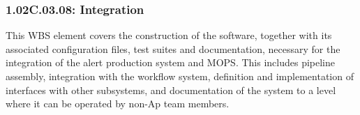 \subsubsection{1.02C.03.08: Integration}

This WBS element covers the construction of the software, together with
its associated configuration files, test suites and documentation, necessary
for the integration of the alert production system and MOPS.  This includes
pipeline assembly, integration with the workflow system, definition and
implementation of interfaces with other subsystems, and documentation
of the system to a level where it can be operated by non-Ap team members.
